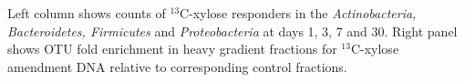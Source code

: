 Left column shows counts of $^{13}$C-xylose responders in the \textit{Actinobacteria, Bacteroidetes, Firmicutes} and \textit{Proteobacteria} at days 1, 3, 7 and 30. Right panel shows OTU fold enrichment in heavy gradient fractions for $^{13}$C-xylose amendment DNA relative to corresponding control fractions. 
    